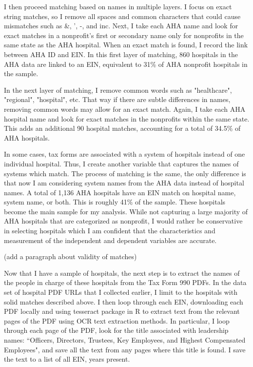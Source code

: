 \documentclass[12pt]{article}
\begin{document}
I then proceed matching based on names in multiple layers. I focus on exact string matches, so I remove all spaces and common characters that could cause mismatches such as \&, ', -, and inc. Next, I take each AHA name and look for exact matches in a nonprofit's first or secondary name only for nonprofits in the same state as the AHA hospital. When an exact match is found, I record the link between AHA ID and EIN. In this first layer of matching, 860 hospitals in the AHA data are linked to an EIN, equivalent to 31\% of AHA nonprofit hospitals in the sample. 

In the next layer of matching, I remove common words such as "healthcare", "regional", "hospital", etc. That way if there are subtle differences in names, removing common words may allow for an exact match. Again, I take each AHA hospital name and look for exact matches in the nonprofits within the same state. This adds an additional 90 hospital matches, accounting for a total of 34.5\% of AHA hospitals. 

In some cases, tax forms are associated with a system of hospitals instead of one individual hospital. Thus, I create another variable that captures the names of systems which match. The process of matching is the same, the only difference is that now I am considering system names from the AHA data instead of hospital names. A total of 1,136 AHA hospitals have an EIN match on hospital name, system name, or both. This is roughly 41\% of the sample. These hospitals become the main sample for my analysis. While not capturing a large majority of AHA hospitals that are categorized as nonprofit, I would rather be conservative in selecting hospitals which I am confident that the characteristics and measurement of the independent and dependent variables are accurate. 

(add a paragraph about validity of matches)

 Now that I have a sample of hospitals, the next step is to extract the names of the people in charge of these hospitals from the Tax Form 990 PDFs. In the data set of hospital PDF URLs that I collected earlier, I limit to the hospitals with solid matches described above. I then loop through each EIN, downloading each PDF locally and using tesseract package in R to extract text from the relevant pages of the PDF using OCR text extraction methods. In particular, I loop through each page of the PDF, look for the title associated with leadership names: ``Officers, Directors, Trustees, Key Employees, and Highest Compensated Employees", and save all the text from any pages where this title is found. I save the text to a list of all EIN, years present. 
\end{document}
